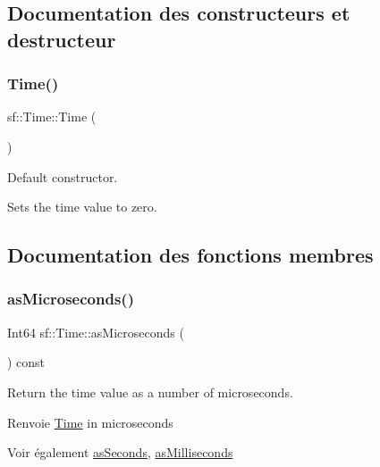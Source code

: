 \subsection{Documentation des constructeurs et destructeur}
\mbox{\label{classsf_1_1Time_acba0cfbc49e3a09a22a8e079eb67a05c}} 
\subsubsection{\texorpdfstring{Time()}{Time()}}
{\footnotesize\ttfamily sf\+::\+Time\+::\+Time (\begin{DoxyParamCaption}{ }\end{DoxyParamCaption})}



Default constructor. 

Sets the time value to zero. 

\subsection{Documentation des fonctions membres}
\mbox{\label{classsf_1_1Time_a000c2c64b74658ebd228b9294a464275}} 
\subsubsection{\texorpdfstring{as\+Microseconds()}{asMicroseconds()}}
{\footnotesize\ttfamily Int64 sf\+::\+Time\+::as\+Microseconds (\begin{DoxyParamCaption}{ }\end{DoxyParamCaption}) const}



Return the time value as a number of microseconds. 

\begin{DoxyReturn}{Renvoie}
\hyperlink{classsf_1_1Time}{Time} in microseconds
\end{DoxyReturn}
\begin{DoxySeeAlso}{Voir également}
\hyperlink{classsf_1_1Time_aa3df2f992d0b0041b4eb02258d43f0e3}{as\+Seconds}, \hyperlink{classsf_1_1Time_aa16858ca030a07eb18958c321f256e5a}{as\+Milliseconds} 
\end{DoxySeeAlso}
\mbox{\label{classsf_1_1Time_aa16858ca030a07eb18958c321f256e5a}} 
